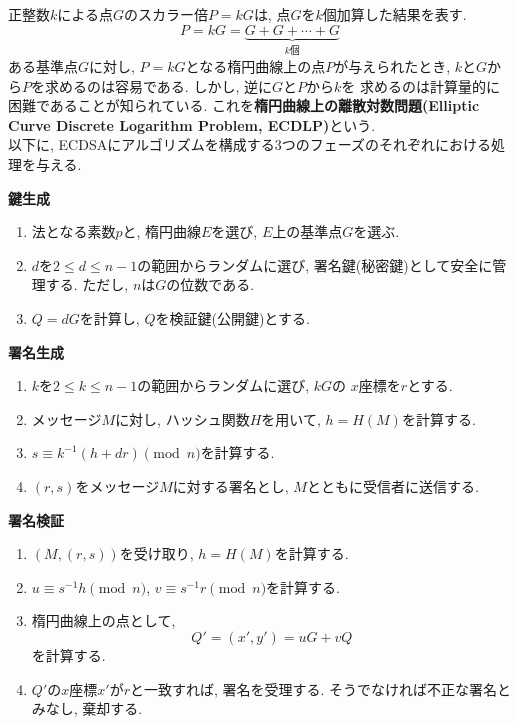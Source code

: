 \vspace{0.5em}
\indent 正整数$k$による点$G$のスカラー倍$P=kG$は, 点$G$を$k$個加算した結果を表す.
\[
  P=kG=\underbrace{G+G+\cdots+G}_{k\text{個}}
\]
\indent ある基準点$G$に対し, $P = kG$となる楕円曲線上の点$P$が与えられたとき, 
$k$と$G$から$P$を求めるのは容易である. しかし, 逆に$G$と$P$から$k$を
求めるのは計算量的に困難であることが知られている. 
これを\textbf{楕円曲線上の離散対数問題(Elliptic Curve Discrete Logarithm Problem, ECDLP)}という.\\
\indent 以下に, ECDSAにアルゴリズムを構成する3つのフェーズのそれぞれにおける処理を与える. \\
\let\ltxlist\list
\begin{breakitembox}[l]{\textbf{鍵生成}}
  　
  \begin{enumerate}[parsep=7pt]
    \item 法となる素数$p$と, 楕円曲線$E$を選び, $E$上の基準点$G$を選ぶ.
    \item $d$を$2\leq d\leq n-1$の範囲からランダムに選び, 
    署名鍵(秘密鍵)として安全に管理する. ただし, $n$は$G$の位数である.
    \item $Q=dG$を計算し, $Q$を検証鍵(公開鍵)とする.
  \end{enumerate}
\end{breakitembox}
\vspace{1em}
\let\ltxlist\list
\begin{breakitembox}[l]{\textbf{署名生成}}
  　
  \begin{enumerate}[parsep=7pt]
    \item $k$を$2\leq k\leq n-1$の範囲からランダムに選び, $kG$の
    $x$座標を$r$とする.
    \item メッセージ$M$に対し, ハッシュ関数$H$を用いて, $h=H(M)$を計算する.
    \item $s\equiv k^{-1}(h+dr)\pmod n$を計算する.
    \item $(r,s)$をメッセージ$M$に対する署名とし, 
    $M$とともに受信者に送信する.
  \end{enumerate}
\end{breakitembox}
\vspace{1em}
\let\ltxlist\list
\begin{breakitembox}[l]{\textbf{署名検証}}
  　
  \begin{enumerate}[parsep=7pt]
    \item $(M,(r,s))$を受け取り, $h=H(M)$を計算する. 
    \item $u\equiv s^{-1}h\pmod n$, $v\equiv s^{-1}r\pmod n$を計算する.
    \item 楕円曲線上の点として, 
    \[
      Q'=(x',y')=uG+vQ
    \]
    を計算する.
    \item $Q'$の$x$座標$x'$が$r$と一致すれば, 署名を受理する.
    そうでなければ不正な署名とみなし, 棄却する.
  \end{enumerate}
\end{breakitembox}
